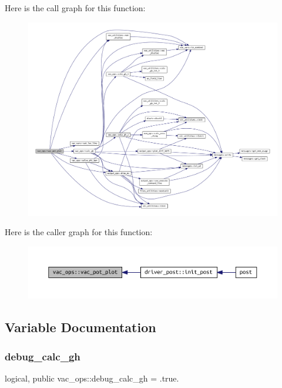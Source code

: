Here is the call graph for this function\+:\nopagebreak
\begin{figure}[H]
\begin{center}
\leavevmode
\includegraphics[width=350pt]{namespacevac__ops_a3a2a3aed45951aecef42197b82a5a6da_cgraph}
\end{center}
\end{figure}
Here is the caller graph for this function\+:\nopagebreak
\begin{figure}[H]
\begin{center}
\leavevmode
\includegraphics[width=350pt]{namespacevac__ops_a3a2a3aed45951aecef42197b82a5a6da_icgraph}
\end{center}
\end{figure}


\subsection{Variable Documentation}
\mbox{\label{namespacevac__ops_a9c1d2227ea0118cb9158f7e08f41affc}} 
\subsubsection{\texorpdfstring{debug\+\_\+calc\+\_\+gh}{debug\_calc\_gh}}
{\footnotesize\ttfamily logical, public vac\+\_\+ops\+::debug\+\_\+calc\+\_\+gh = .true.}



